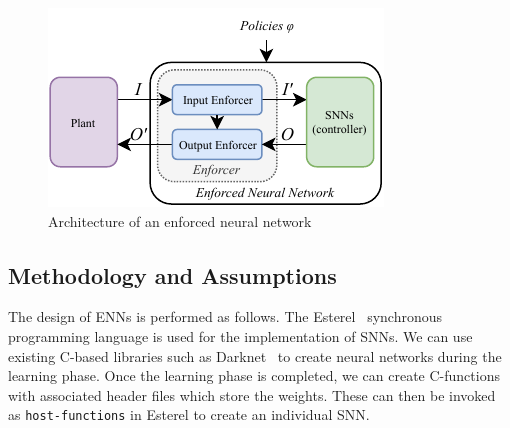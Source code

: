\begin{figure}[!htb]
	\centering
	\includegraphics[width = \textwidth]{Content/fig/model-driven-ai-enns.pdf}
	\caption{Architecture of an enforced neural network}
	\label{fig:rebasic}
\end{figure}





\subsection{Methodology and Assumptions}

The design of \acp{ENN} is performed as follows. The Esterel~\cite{Berry00}
synchronous programming language is used for the implementation of
\acp{SNN}. We can use existing C-based libraries such as
Darknet~\cite{darknet13} to create neural networks during the learning
phase. Once the learning phase is completed, we can create C-functions
with associated header files which store the weights. These can then be
invoked as \texttt{host-functions} in Esterel to create an individual \ac{SNN}. 

